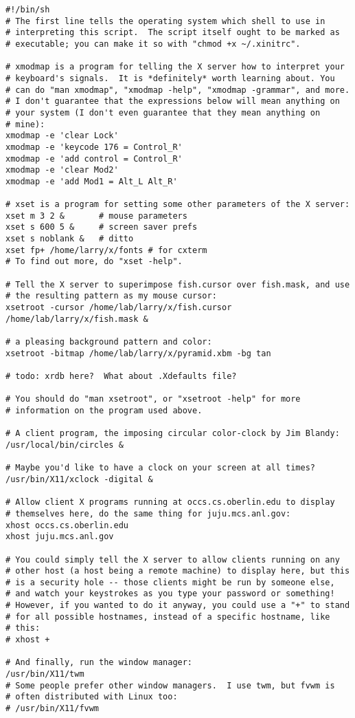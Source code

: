 \begin{screen}\begin{verbatim}
#!/bin/sh
# The first line tells the operating system which shell to use in
# interpreting this script.  The script itself ought to be marked as
# executable; you can make it so with "chmod +x ~/.xinitrc". 

# xmodmap is a program for telling the X server how to interpret your
# keyboard's signals.  It is *definitely* worth learning about. You
# can do "man xmodmap", "xmodmap -help", "xmodmap -grammar", and more.
# I don't guarantee that the expressions below will mean anything on
# your system (I don't even guarantee that they mean anything on
# mine):
xmodmap -e 'clear Lock'
xmodmap -e 'keycode 176 = Control_R'
xmodmap -e 'add control = Control_R'
xmodmap -e 'clear Mod2'
xmodmap -e 'add Mod1 = Alt_L Alt_R'

# xset is a program for setting some other parameters of the X server:
xset m 3 2 &       # mouse parameters
xset s 600 5 &     # screen saver prefs  
xset s noblank &   # ditto
xset fp+ /home/larry/x/fonts # for cxterm
# To find out more, do "xset -help".

# Tell the X server to superimpose fish.cursor over fish.mask, and use
# the resulting pattern as my mouse cursor:
xsetroot -cursor /home/lab/larry/x/fish.cursor /home/lab/larry/x/fish.mask &

# a pleasing background pattern and color:
xsetroot -bitmap /home/lab/larry/x/pyramid.xbm -bg tan

# todo: xrdb here?  What about .Xdefaults file?

# You should do "man xsetroot", or "xsetroot -help" for more
# information on the program used above. 

# A client program, the imposing circular color-clock by Jim Blandy:
/usr/local/bin/circles &

# Maybe you'd like to have a clock on your screen at all times?
/usr/bin/X11/xclock -digital &

# Allow client X programs running at occs.cs.oberlin.edu to display
# themselves here, do the same thing for juju.mcs.anl.gov:
xhost occs.cs.oberlin.edu
xhost juju.mcs.anl.gov

# You could simply tell the X server to allow clients running on any
# other host (a host being a remote machine) to display here, but this
# is a security hole -- those clients might be run by someone else,
# and watch your keystrokes as you type your password or something!
# However, if you wanted to do it anyway, you could use a "+" to stand
# for all possible hostnames, instead of a specific hostname, like
# this:
# xhost +

# And finally, run the window manager:
/usr/bin/X11/twm
# Some people prefer other window managers.  I use twm, but fvwm is
# often distributed with Linux too:
# /usr/bin/X11/fvwm
\end{verbatim}\end{screen}


